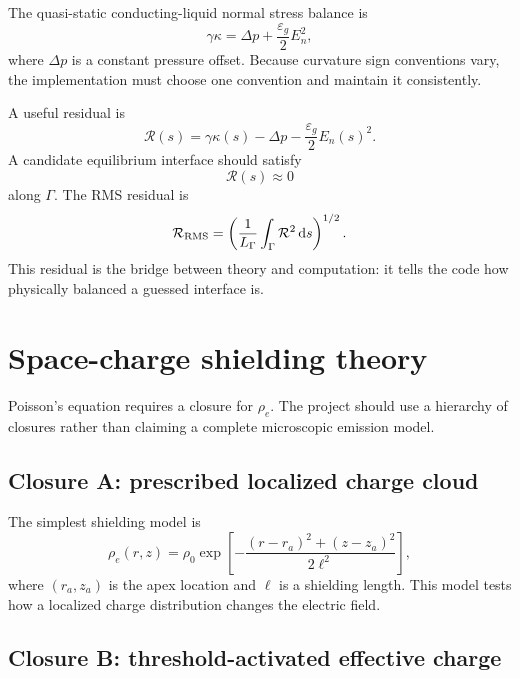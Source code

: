 \documentclass[11pt]{article}
\newcommand{\eps}{\varepsilon}
\newcommand{\dd}{\,\mathrm{d}}
\begin{document}
The quasi-static conducting-liquid normal stress balance is
\begin{equation}
    \gamma\kappa=\Delta p+\frac{\eps_g}{2}E_n^2,
    \label{eq:ylm}
\end{equation}
where \(\Delta p\) is a constant pressure offset.  Because curvature sign conventions vary, the implementation must choose one convention and maintain it consistently.

A useful residual is
\begin{equation}
    \mathcal R(s)
    =
    \gamma\kappa(s)-\Delta p-\frac{\eps_g}{2}E_n(s)^2.
    \label{eq:residual}
\end{equation}
A candidate equilibrium interface should satisfy
\begin{equation}
    \mathcal R(s)\approx0
\end{equation}
along \(\Gamma\).  The RMS residual is
\begin{equation}
    \mathcal R_{\rm RMS}
    =
    \left(\frac{1}{L_\Gamma}\int_\Gamma \mathcal R^2\dd s\right)^{1/2}.
\end{equation}
This residual is the bridge between theory and computation: it tells the code how physically balanced a guessed interface is.

\section{Space-charge shielding theory}

Poisson's equation requires a closure for \(\rho_e\).  The project should use a hierarchy of closures rather than claiming a complete microscopic emission model.

\subsection{Closure A: prescribed localized charge cloud}

The simplest shielding model is
\begin{equation}
    \rho_e(r,z)
    =
    \rho_0\exp\left[-\frac{(r-r_a)^2+(z-z_a)^2}{2\ell^2}\right],
    \label{eq:gaussian}
\end{equation}
where \((r_a,z_a)\) is the apex location and \(\ell\) is a shielding length.  This model tests how a localized charge distribution changes the electric field.

\subsection{Closure B: threshold-activated effective charge}
\end{document}
